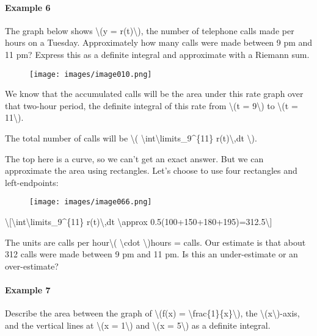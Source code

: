 \hypertarget{example-6}{%
\paragraph{Example 6}\label{example-6}}

The graph below shows \textbackslash{}(y = r(t)\textbackslash{}), the
number of telephone calls made per hours on a Tuesday. Approximately how
many calls were made between 9 pm and 11 pm? Express this as a definite
integral and approximate with a Riemann sum.

\begin{figure}
\centering
\texttt{[image: images/image010.png]}
\caption{}
\end{figure}

We know that the accumulated calls will be the area under this rate
graph over that two-hour period, the definite integral of this rate from
\textbackslash{}(t = 9\textbackslash{}) to \textbackslash{}(t =
11\textbackslash{}).

The total number of calls will be \textbackslash{}(
\textbackslash{}int\textbackslash{}limits\_9\^{}\{11\}
r(t)\textbackslash{},dt \textbackslash{}).

The top here is a curve, so we can't get an exact answer. But we can
approximate the area using rectangles. Let's choose to use four
rectangles and left-endpoints:

\begin{figure}
\centering
\texttt{[image: images/image066.png]}
\caption{}
\end{figure}

\textbackslash{}{[}\textbackslash{}int\textbackslash{}limits\_9\^{}\{11\}
r(t)\textbackslash{},dt \textbackslash{}approx
0.5(100+150+180+195)=312.5\textbackslash{}{]}

The units are calls per hour\textbackslash{}( \textbackslash{}cdot
\textbackslash{})hours = calls. Our estimate is that about 312 calls
were made between 9 pm and 11 pm. Is this an under-estimate or an
over-estimate?

\hypertarget{example-7}{%
\paragraph{Example 7}\label{example-7}}

Describe the area between the graph of \textbackslash{}(f(x) =
\textbackslash{}frac\{1\}\{x\}\textbackslash{}), the
\textbackslash{}(x\textbackslash{})-axis, and the vertical lines at
\textbackslash{}(x = 1\textbackslash{}) and \textbackslash{}(x =
5\textbackslash{}) as a definite integral.

